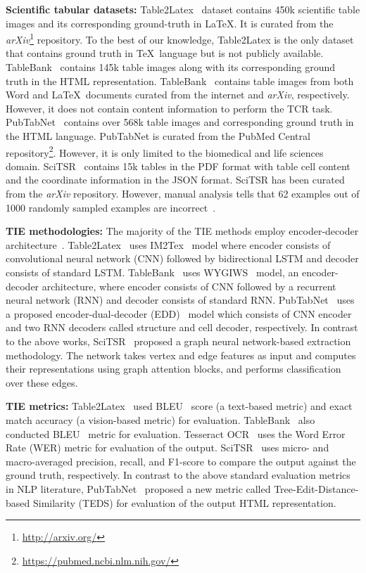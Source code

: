 \documentclass[runningheads]{llncs}
\begin{document}
\noindent \textbf{Scientific tabular datasets:}
Table2Latex~\cite{table2latex} dataset contains 450k scientific table images and its corresponding ground-truth in \LaTeX. It is curated from the \textit{arXiv}\footnote{\label{arxivfootnote}\url{http://arxiv.org/}} repository. To the best of our knowledge, Table2Latex is the only dataset that contains ground truth in \TeX~language but is not publicly available. TableBank~\cite{tablebank} contains 145k table images along with its corresponding ground truth in the HTML representation. TableBank~\cite{tablebank} contains table images from both Word and \LaTeX~documents curated from the internet and \textit{arXiv}, respectively. However, it does not contain content information to perform the TCR task. PubTabNet~\cite{pubtabnet} contains over 568k table images and corresponding ground truth in the HTML language. PubTabNet is curated from the PubMed Central repository\footnote{\label{pubmed}\url{https://pubmed.ncbi.nlm.nih.gov/}}. However, it is only limited to the biomedical and life sciences domain. SciTSR~\cite{scitsr} contains 15k tables in the PDF format with table cell content and the coordinate information in the JSON format. SciTSR has been curated from the \textit{arXiv} repository. However, manual analysis tells that 62 examples out of 1000 randomly sampled examples are incorrect~\cite{TableRobot}.

\noindent \textbf{TIE methodologies:}
The majority of the TIE methods employ encoder-decoder architecture~\cite{table2latex,tablebank,pubtabnet}.  Table2Latex~\cite{table2latex} uses IM2Tex~\cite{im2tex} model where encoder consists of convolutional neural network (CNN) followed by bidirectional LSTM and decoder consists of standard LSTM. TableBank~\cite{tablebank} uses WYGIWS~\cite{Deng2016WhatYG} model, an encoder-decoder architecture, where encoder consists of CNN followed by a recurrent neural network (RNN) and decoder consists of standard RNN. PubTabNet~\cite{pubtabnet} uses a proposed encoder-dual-decoder (EDD)~\cite{pubtabnet} model which consists of CNN encoder and two RNN decoders called structure and cell decoder, respectively. In contrast to the above works, SciTSR~\cite{scitsr} proposed a graph neural network-based extraction methodology. The network takes vertex and edge features as input and computes their representations using graph attention blocks, and performs classification over these edges.


\noindent \textbf{TIE metrics:}
Table2Latex~\cite{table2latex} used BLEU~\cite{bleu} score (a text-based metric) and exact match accuracy (a vision-based metric) for evaluation.
TableBank~\cite{tablebank} also conducted BLEU~\cite{bleu} metric for evaluation.  Tesseract OCR~\cite{smith2007overview} uses the Word Error Rate (WER) metric for evaluation of the output. SciTSR~\cite{scitsr} uses micro- and macro-averaged precision, recall, and F1-score to compare the output against the ground truth, respectively. In contrast to the above standard evaluation metrics in NLP literature,  PubTabNet~\cite{pubtabnet} proposed a new metric called Tree-Edit-Distance-based Similarity (TEDS) for evaluation of the output HTML representation. 
\end{document}
